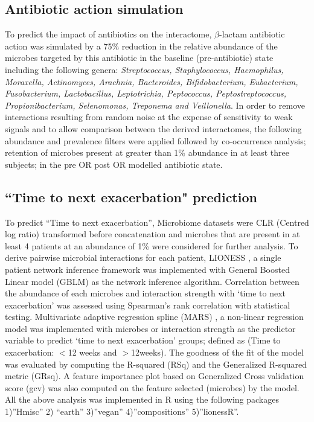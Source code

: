 \subsection{Antibiotic action simulation}

To predict the impact of antibiotics on the interactome, $\beta$-lactam antibiotic action was simulated by a 75\% reduction in the relative abundance of the microbes targeted by this antibiotic in the baseline (pre-antibiotic) state including the following genera: \emph{Streptococcus, Staphylococcus, Haemophilus, Moraxella, Actinomyces, Arachnia, Bacteroides, Bifidobacterium, Eubacterium, Fusobacterium, Lactobacillus, Leptotrichia, Peptococcus, Peptostreptococcus, Propionibacterium, Selenomonas, Treponema and Veillonella}. In order to remove interactions resulting from random noise at the expense of sensitivity to weak signals and to allow comparison between the derived interactomes, the following abundance and prevalence filters were applied followed by co-occurrence analysis; retention of microbes present at greater than 1\% abundance in at least three subjects; in the pre OR post OR modelled antibiotic state.

\subsection{``Time to next exacerbation" prediction}

To predict “Time to next exacerbation”, Microbiome datasets were CLR (Centred log ratio) transformed before concatenation and microbes that are present in at least 4 patients at an abundance of 1\% were considered for further analysis. To derive pairwise microbial interactions for each patient, LIONESS \cite{Kuijjer2019}, a single patient network inference framework was implemented with General Boosted Linear model (GBLM) as the network inference algorithm. Correlation between the abundance of each microbes and interaction strength with ‘time to next exacerbation’ was assessed using Spearman’s rank correlation with statistical testing. Multivariate adaptive regression spline (MARS) \cite{Friedman1991}, a non-linear regression model was implemented with microbes or interaction strength as the predictor variable to predict ‘time to next exacerbation’ groups; defined as (Time to exacerbation: $<$12 weeks and $>$12weeks). The goodness of the fit of the model was evaluated by computing the R-squared (RSq) and the Generalized R-squared metric (GRsq). A feature importance plot based on Generalized Cross validation score (gcv) was also computed on the feature selected (microbes) by the model.  All the above analysis was implemented in R using the following packages 1)”Hmisc” 2) “earth” 3)”vegan” 4)”compositions” 5)”lionessR”.

